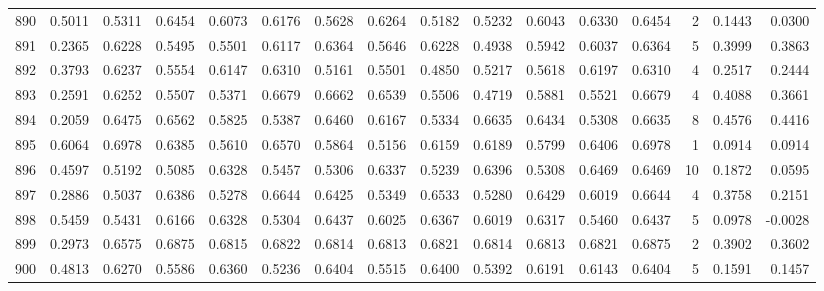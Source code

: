 \begin{tabular}{lrrrrrrrrrrrrrrr}
890 &      0.5011 &  0.5311 &  0.6454 &  0.6073 &  0.6176 &  0.5628 &  0.6264 &  0.5182 &  0.5232 &  0.6043 &   0.6330 &     0.6454 &      2 &                    0.1443 &                     0.0300 \\
891 &      0.2365 &  0.6228 &  0.5495 &  0.5501 &  0.6117 &  0.6364 &  0.5646 &  0.6228 &  0.4938 &  0.5942 &   0.6037 &     0.6364 &      5 &                    0.3999 &                     0.3863 \\
892 &      0.3793 &  0.6237 &  0.5554 &  0.6147 &  0.6310 &  0.5161 &  0.5501 &  0.4850 &  0.5217 &  0.5618 &   0.6197 &     0.6310 &      4 &                    0.2517 &                     0.2444 \\
893 &      0.2591 &  0.6252 &  0.5507 &  0.5371 &  0.6679 &  0.6662 &  0.6539 &  0.5506 &  0.4719 &  0.5881 &   0.5521 &     0.6679 &      4 &                    0.4088 &                     0.3661 \\
894 &      0.2059 &  0.6475 &  0.6562 &  0.5825 &  0.5387 &  0.6460 &  0.6167 &  0.5334 &  0.6635 &  0.6434 &   0.5308 &     0.6635 &      8 &                    0.4576 &                     0.4416 \\
895 &      0.6064 &  0.6978 &  0.6385 &  0.5610 &  0.6570 &  0.5864 &  0.5156 &  0.6159 &  0.6189 &  0.5799 &   0.6406 &     0.6978 &      1 &                    0.0914 &                     0.0914 \\
896 &      0.4597 &  0.5192 &  0.5085 &  0.6328 &  0.5457 &  0.5306 &  0.6337 &  0.5239 &  0.6396 &  0.5308 &   0.6469 &     0.6469 &     10 &                    0.1872 &                     0.0595 \\
897 &      0.2886 &  0.5037 &  0.6386 &  0.5278 &  0.6644 &  0.6425 &  0.5349 &  0.6533 &  0.5280 &  0.6429 &   0.6019 &     0.6644 &      4 &                    0.3758 &                     0.2151 \\
898 &      0.5459 &  0.5431 &  0.6166 &  0.6328 &  0.5304 &  0.6437 &  0.6025 &  0.6367 &  0.6019 &  0.6317 &   0.5460 &     0.6437 &      5 &                    0.0978 &                    -0.0028 \\
899 &      0.2973 &  0.6575 &  0.6875 &  0.6815 &  0.6822 &  0.6814 &  0.6813 &  0.6821 &  0.6814 &  0.6813 &   0.6821 &     0.6875 &      2 &                    0.3902 &                     0.3602 \\
900 &      0.4813 &  0.6270 &  0.5586 &  0.6360 &  0.5236 &  0.6404 &  0.5515 &  0.6400 &  0.5392 &  0.6191 &   0.6143 &     0.6404 &      5 &                    0.1591 &                     0.1457 \\

\end{tabular}
